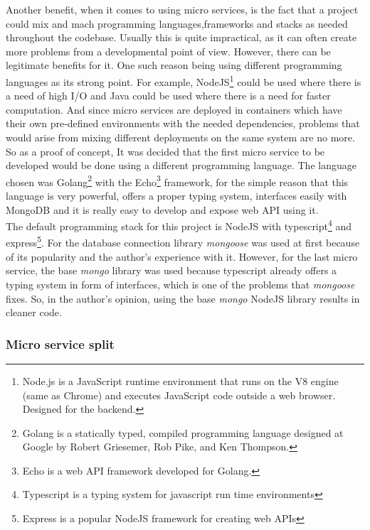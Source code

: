 \documentclass{article}
\newcommand{\vspaceconst}{-2ex}
\begin{document}
\begin{multicols}{2}
Another benefit, when it comes to using micro services, is the fact that a project could mix and mach programming languages,frameworks and stacks as needed throughout the codebase. Usually this is quite impractical, as it can often create more problems from a developmental point of view. However, there can be legitimate benefits for it. One such reason being using different programming languages as its strong point. For example, NodeJS\footnote{Node.js is a JavaScript runtime environment that runs on the V8 engine (same as Chrome) and executes JavaScript code outside a web browser. Designed for the backend.} could be used where there is a need of high I/O and Java could be used where there is a need for faster computation. And since micro services are deployed in containers which have their own pre-defined environments with the needed dependencies, problems that would arise from mixing different deployments on the same system are no more.\\
So as a proof of concept, It was decided that the first micro service to be developed would be done using a different programming language. The language chosen was Golang\footnote{Golang is a statically typed, compiled programming language designed at Google by Robert Griesemer, Rob Pike, and Ken Thompson.} with the Echo\footnote{Echo is a web API framework developed for Golang.} framework, for the simple reason that this language is very powerful, offers a proper typing system, interfaces easily with MongoDB and it is really easy to develop and expose web API using it.\\
The default programming stack for this project is NodeJS with typescript\footnote{Typescript is a typing system for javascript run time environments} and express\footnote{Express is a popular NodeJS framework for creating web APIs}. For the database connection library \textit{mongoose} was used at first because of its popularity and the author's experience with it. However, for the last micro service, the base \textit{mongo} library was used because typescript already offers a typing system in form of interfaces, which is one of the problems that \textit{mongoose} fixes. So, in the author's opinion, using the base \textit{mongo} NodeJS library results in cleaner code.\\

\subsubsection{Micro service split}
\vspace{\vspaceconst}


\end{multicols}
\end{document}
